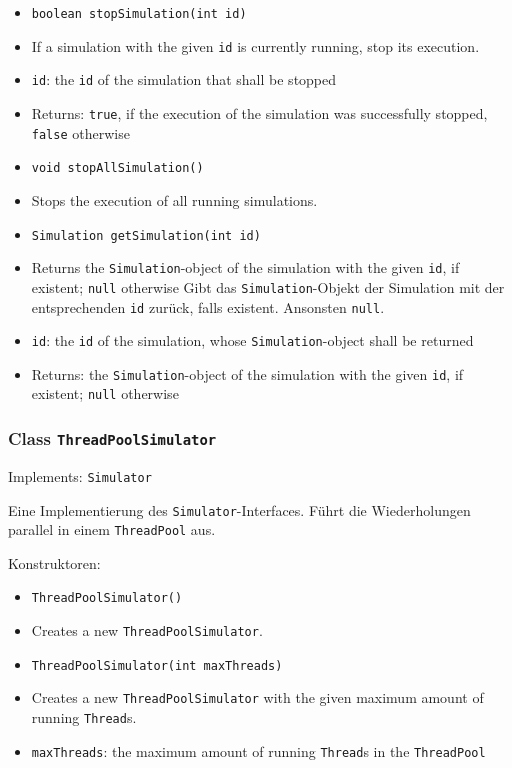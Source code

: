 \documentclass[parskip=full,11pt]{scrartcl}
\begin{document}
\begin{itemize}
\item \texttt{boolean stopSimulation(int id)}
\item[] If a simulation with the given \texttt{id} is currently running, stop its execution.
\item[] \texttt{id}: the \texttt{id} of the simulation that shall be stopped
\item[] Returns: \texttt{true}, if the execution of the simulation was successfully stopped, \texttt{false} otherwise

\item \texttt{void stopAllSimulation()}
\item[] Stops the execution of all running simulations.

\item \texttt{Simulation getSimulation(int id)}
\item[] Returns the \texttt{Simulation}-object of the simulation with the given \texttt{id}, if existent; \texttt{null} otherwise
Gibt das \texttt{Simulation}-Objekt der Simulation mit der entsprechenden \texttt{id} zurück, falls existent. Ansonsten \texttt{null}.
\item[] \texttt{id}: the \texttt{id} of the simulation, whose \texttt{Simulation}-object shall be returned
\item[] Returns: the \texttt{Simulation}-object of the simulation with the given \texttt{id}, if existent; \texttt{null} otherwise
\end{itemize}

\subsubsection{Class \texttt{ThreadPoolSimulator}}
Implements: \texttt{Simulator}

Eine Implementierung des \texttt{Simulator}-Interfaces. Führt die Wiederholungen parallel in einem \texttt{ThreadPool} aus.

Konstruktoren:
\begin{itemize}\itemsep -10pt
\item \texttt{ThreadPoolSimulator()}
\item[] Creates a new \texttt{ThreadPoolSimulator}.

\item \texttt{ThreadPoolSimulator(int maxThreads)}
\item[] Creates a new \texttt{ThreadPoolSimulator} with the given maximum amount of running \texttt{Thread}s.
\item[] \texttt{maxThreads}: the maximum amount of running \texttt{Thread}s in the \texttt{ThreadPool}
\end{itemize}
\end{document}
